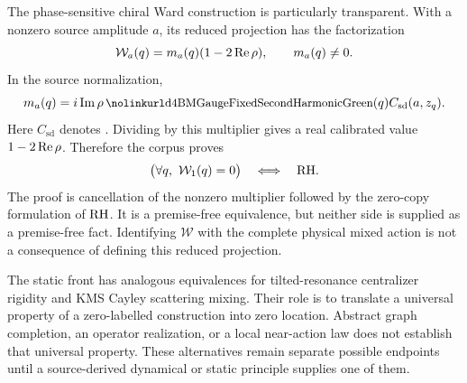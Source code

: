 The phase-sensitive chiral Ward construction is particularly transparent. With a nonzero source amplitude \(a\), its reduced projection has the factorization
\[
 \mathcal W_a(q)=m_a(q)(1-2\operatorname{Re}\rho),\qquad m_a(q)\ne0.
\]
In the source normalization,
\[
 m_a(q)=i\im\rho\,
   \code{d4BMGaugeFixedSecondHarmonicGreen}(q)
   C_{\mathrm{sd}}(a,z_q).
\]
Here \(C_{\mathrm{sd}}\) denotes .
Dividing by this multiplier gives a real calibrated value \(1-2\operatorname{Re}\rho\). Therefore the corpus proves
\[
 \bigl(\forall q,\ \mathcal W_1(q)=0\bigr)\quad\Longleftrightarrow\quad\mathrm{RH}.
\]
The proof is cancellation of the nonzero multiplier followed by the zero-copy formulation of \(\mathrm{RH}\). It is a premise-free equivalence, but neither side is supplied as a premise-free fact. Identifying \(\mathcal W\) with the complete physical mixed action is not a consequence of defining this reduced projection.

The static front has analogous equivalences for tilted-resonance centralizer rigidity and KMS Cayley scattering mixing.
Their role is to translate a universal property of a zero-labelled construction into zero location. Abstract graph completion, an operator realization, or a local near-action law does not establish that universal property. These alternatives remain separate possible endpoints until a source-derived dynamical or static principle supplies one of them.

